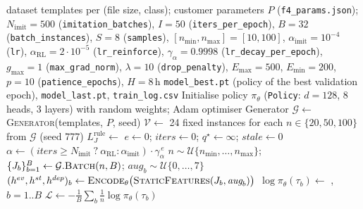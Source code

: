 \documentclass[10pt]{article}
\begin{document}
\begin{algorithm}[H]
\caption{RL Training (formulation~4: attention policy, imitation warm-up, then REINFORCE with a shared baseline)}
\label{alg:rl-training}
\small
\begin{algorithmic}[1]
\Require dataset templates per (file size, class); customer parameters $P$ (\texttt{f4\_params.json});
  $N_{\text{imit}}{=}500$ (\texttt{imitation\_batches}), $I{=}50$ (\texttt{iters\_per\_epoch}),
  $B{=}32$ (\texttt{batch\_instances}), $S{=}8$ (\texttt{samples}), $[n_{\min},n_{\max}]{=}[10,100]$,
  $\alpha_{\text{imit}}{=}10^{-4}$ (\texttt{lr}), $\alpha_{\text{RL}}{=}2{\cdot}10^{-5}$ (\texttt{lr\_reinforce}),
  $\gamma_{\alpha}{=}0.9998$ (\texttt{lr\_decay\_per\_epoch}), $g_{\max}{=}1$ (\texttt{max\_grad\_norm}),
  $\lambda{=}10$ (\texttt{drop\_penalty}), $E_{\max}{=}500$, $E_{\min}{=}200$, $p{=}10$ (\texttt{patience\_epochs}),
  $H{=}8$\,h
\Ensure \texttt{model\_best.pt} (policy of the best validation epoch), \texttt{model\_last.pt}, \texttt{train\_log.csv}
\State Initialise policy $\pi_\theta$ (\texttt{Policy}: $d{=}128$, 8 heads, 3 layers) with random weights; Adam optimiser
\State Generator $\mathcal G \gets$ \textsc{Generator}(templates, $P$, seed)
\State $\mathcal V \gets$ 24 fixed instances for each $n\in\{20,50,100\}$ from $\mathcal G$ (seed 777)
 
  \State $L^{\text{rule}}_J \gets$  
\EndFor
\State $e\gets 0$;\; $\textit{iters}\gets 0$;\; $q^{\star}\gets\infty$;\; $\textit{stale}\gets 0$
  \State $\alpha \gets (\textit{iters}\ge N_{\text{imit}}\ ?\ \alpha_{\text{RL}} : \alpha_{\text{imit}})\cdot\gamma_\alpha^{\,e}$ 
   
    \State $n\sim\mathcal U\{n_{\min},\dots,n_{\max}\}$;\; $\{J_b\}_{b=1}^{B}\gets\mathcal G.\textsc{Batch}(n,B)$;\; $\textit{aug}_b\sim\mathcal U\{0,\dots,7\}$
    \State $(h^{ev},h^{st},h^{dep})_b \gets \textsc{Encode}_\theta\big(\textsc{StaticFeatures}(J_b,\textit{aug}_b)\big)$ 
     
      \State $\log\pi_\theta(\tau_b) \gets$ , $b=1..B$
      \State $\mathcal L \gets -\frac1B\sum_b \frac1n\log\pi_\theta(\tau_b)$

\end{algorithmic}
\end{algorithm}
\end{document}
